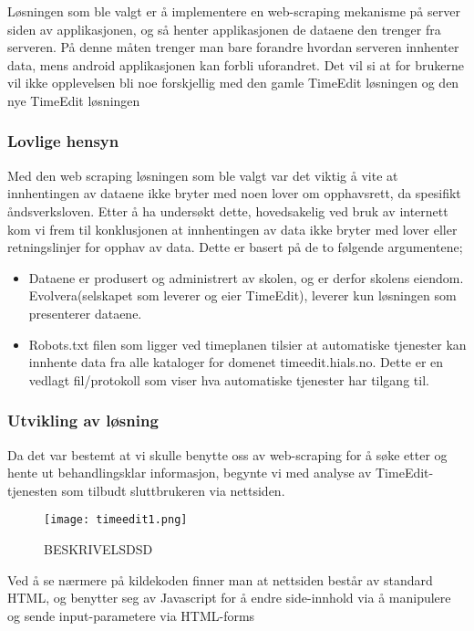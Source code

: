 \documentclass[../main.tex]{subfiles}
\begin{document}
\newline
Løsningen som ble valgt er å implementere en web-scraping mekanisme på server siden av applikasjonen, og så henter applikasjonen de dataene den trenger fra serveren. På denne måten trenger man bare forandre hvordan serveren innhenter data, mens android applikasjonen kan forbli uforandret. Det vil si at for brukerne vil ikke opplevelsen bli noe forskjellig med den gamle TimeEdit løsningen og den nye TimeEdit løsningen

\subsubsection{Lovlige hensyn}

Med den web scraping løsningen som ble valgt var det viktig å vite at innhentingen av dataene ikke bryter med noen lover om opphavsrett, da spesifikt åndsverksloven.
Etter å ha undersøkt dette, hovedsakelig ved bruk av internett kom vi frem til konklusjonen at innhentingen av data ikke bryter med lover eller retningslinjer for opphav av data. Dette er basert på de to følgende argumentene;

\begin{itemize}
\item Dataene er produsert og administrert av skolen, og er derfor skolens eiendom. Evolvera(selskapet som leverer og eier TimeEdit), leverer kun løsningen som presenterer dataene.
\item Robots.txt filen som ligger ved timeplanen tilsier at automatiske tjenester kan innhente data fra alle kataloger for domenet timeedit.hials.no. Dette er en vedlagt fil/protokoll som viser hva automatiske tjenester har tilgang til.
\end{itemize}

\subsubsection{Utvikling av løsning}

Da det var bestemt at vi skulle benytte oss av web-scraping for å søke etter og hente ut behandlingsklar informasjon, begynte vi med analyse av TimeEdit-tjenesten som tilbudt sluttbrukeren via nettsiden.

\begin{figure}[H]
  \centering
  \texttt{[image: timeedit1.png]}
  \caption{BESKRIVELSDSD}
\end{figure}

Ved å se nærmere på kildekoden finner man at nettsiden består av standard HTML, og benytter seg av Javascript for å endre side-innhold via å manipulere og sende input-parametere via HTML-forms
\end{document}
